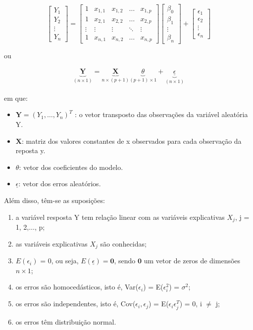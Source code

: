 \documentclass[
	12pt,				%
	a4paper,		%
	oneside,    %
	chapter=TITLE,		   %
	section=TITLE,		   %
	subsection=TITLE,	   %
	subsubsection=TITLE, %
	english,			%
	french,				%
	spanish,			%
	brazil,				%
]{abntex2}
\begin{document}
\[
\begin{bmatrix}
Y_1 \\
Y_2 \\
\vdots \\
Y_n
\end{bmatrix}
=
\begin{bmatrix}
1 & x_{1,1} & x_{1,2} & \dots & x_{1,p} \\
1 & x_{2,1} & x_{2,2} & \dots & x_{2,p} \\
\vdots & \vdots & \vdots & \ddots & \vdots \\
1 & x_{n,1} & x_{n,2} & \dots & x_{n,p}
\end{bmatrix}
\begin{bmatrix}
\beta_0 \\
\beta_1 \\
\vdots \\
\beta_n
\end{bmatrix}
+
\begin{bmatrix}
\epsilon_1 \\
\epsilon_2 \\
\vdots \\
\epsilon_n
\end{bmatrix}
\]

ou

\[
\begin{matrix}
\underbrace{\textbf{Y}}_{(n\times 1)} 
= 
\underbrace{\textbf{X}}_{n\times(p+1)}
\underbrace{\theta}_{(p+1)\times1}
+
\underbrace{\underline{ \epsilon}}_{(n\times 1)}
\end{matrix}
\]

em que:

\begin{itemize}
\item
  \(\textbf{Y} = (Y_1,\dots , Y_n)^T\) : o vetor transposto das
  observações da variável aleatória Y.
\item
  \(\textbf{X}\): matriz dos valores constantes de x observados para
  cada observação da reposta y.
\item
  \(\theta\): vetor dos coeficientes do modelo.
\item
  \(\underline{ \epsilon}\): vetor dos erros aleatórios.
\end{itemize}

Além disso, têm-se as suposições:

\begin{enumerate}[label=(\roman*)]
\item a variável resposta Y tem relação linear com as variáveis explicativas $X_j$, j = 1, 2,$\dots$, p;
\item as variáveis explicativas $X_j$ são conhecidas;
\item $E(\epsilon_i)$ = 0, ou seja, $E(\underline{ \epsilon}) = \textbf{0}$, sendo $\textbf{0}$ um vetor de zeros de dimensões $n \times 1$;
\item os erros são homocedásticos, isto é, Var($\epsilon_i$) = E($\epsilon_i^2$) = $\sigma^2$;
\item os erros são independentes, isto é, Cov($\epsilon_i,\epsilon_{j}$) = E($\epsilon_i \epsilon_{j}^T$) = 0, i $\neq$ j;
\item os erros têm distribuição normal.
\end{enumerate}
\end{document}
